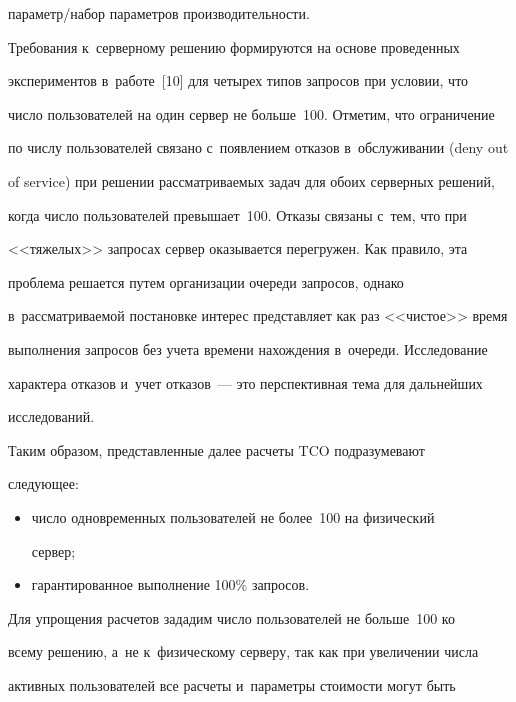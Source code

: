 па\-ра\-метр/на\-бор параметров про\-из\-во\-ди\-тель\-ности.

  

  Требования к~серверному решению формируются на основе проведенных 

экспериментов в~работе~[10] для четырех типов запросов при условии, что 

число пользователей на один сервер не больше~100. Отметим, что ограничение 

по числу пользователей связано с~появлением отказов в~обслуживании (deny out 

of service) при решении рассматриваемых задач для обоих серверных решений, 

когда число пользователей превышает~100. Отказы связаны с~тем, что при 

<<тяжелых>> запросах сервер оказывается перегружен. Как правило, эта 

проблема решается путем организации очереди запросов, однако 

в~рассматриваемой постановке интерес представляет как раз <<чистое>> время 

выполнения запросов без учета времени нахождения в~очереди. Исследование 

характера отказов и~учет отказов~--- это перспективная тема для дальнейших 

исследований. 

  

  Таким образом, представленные далее расчеты TCO подразумевают 

сле\-ду\-ющее:

  \begin{itemize}

\item число одновременных пользователей не более~100 на физический 

сервер;\\[-13pt]

\item гарантированное выполнение 100\% запросов.

\end{itemize}

    

    Для упрощения расчетов зададим чис\-ло пользователей не больше~100 ко 

всему решению, а~не к~физическому серверу, так как при увеличении числа 

активных пользователей все расчеты и~параметры стоимости могут быть 

